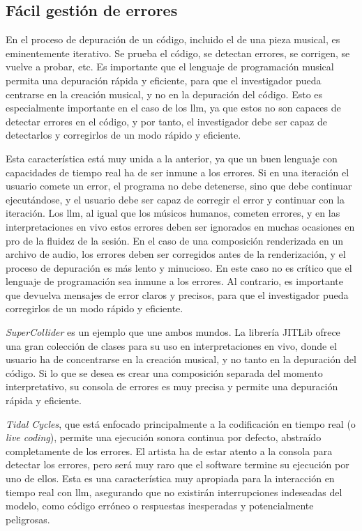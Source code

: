 \subsection{Fácil gestión de errores}
En el proceso de depuración de un código, incluido el de una pieza musical, es eminentemente iterativo. Se prueba el código, se detectan errores, se corrigen, se vuelve a probar, etc. Es importante que el lenguaje de programación musical permita una depuración rápida y eficiente, para que el investigador pueda centrarse en la creación musical, y no en la depuración del código. Esto es especialmente importante en el caso de los \gls{llm}, ya que estos no son capaces de detectar errores en el código, y por tanto, el investigador debe ser capaz de detectarlos y corregirlos de un modo rápido y eficiente.

Esta característica está muy unida a la anterior, ya que un buen lenguaje con capacidades de tiempo real ha de ser inmune a los errores. Si en una iteración el usuario comete un error, el programa no debe detenerse, sino que debe continuar ejecutándose, y el usuario debe ser capaz de corregir el error y continuar con la iteración. Los \gls{llm}, al igual que los músicos humanos, cometen errores, y en las interpretaciones en vivo estos errores deben ser ignorados en muchas ocasiones en pro de la fluidez de la sesión. En el caso de una composición renderizada en un archivo de audio, los errores deben ser corregidos antes de la renderización, y el proceso de depuración es más lento y minucioso. En este caso no es crítico que el lenguaje de programación sea inmune a los errores. Al contrario, es importante que devuelva mensajes de error claros y precisos, para que el investigador pueda corregirlos de un modo rápido y eficiente. 

\emph{SuperCollider} es un ejemplo que une ambos mundos. La librería {JITLib} ofrece una gran colección de clases para su uso en interpretaciones en vivo, donde el usuario ha de concentrarse en la creación musical, y no tanto en la depuración del código. Si lo que se desea es crear una composición separada del momento interpretativo, su consola de errores es muy precisa y permite una depuración rápida y eficiente.

\emph{Tidal Cycles}, que está enfocado principalmente a la codificación en tiempo real (o \emph{live coding}), permite una ejecución sonora continua por defecto, abstraído completamente de los errores. El artista ha de estar atento a la consola para detectar los errores, pero será muy raro que el software termine su ejecución por uno de ellos. Esta es una característica muy apropiada para la interacción en tiempo real con \gls{llm}, asegurando que no existirán interrupciones indeseadas del modelo, como código erróneo o respuestas inesperadas y potencialmente peligrosas.

